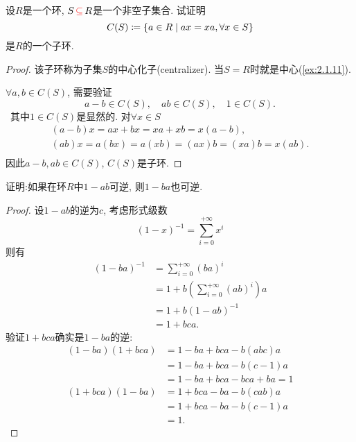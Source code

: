 \begin{problem}\label{ex:1.2.4}
    设$R$是一个环, $S \,\textcolor{red}{\subseteq}\, R$是一个非空子集合. 试证明
    \[
        C(S) \mathrel{\coloneqq} \{a \in R \mid ax = xa, \forall x \in S \}
    \]
    是$R$的一个子环.
\end{problem}

\begin{proof}
    该子环称为子集$S$的中心化子(centralizer). 当$S = R$时就是中心(\ref{ex:2.1.11}).

    $\forall a, b \in C(S)$, 需要验证
    \[
        a - b \in C(S), \quad ab \in C(S), \quad 1 \in C(S).
    \]\
    其中$1 \in C(S)$是显然的. 对$\forall x \in S$
    \[
    \begin{gathered}
        (a - b)x = ax + bx = xa + xb = x(a - b),\\
        (ab)x = a(bx) = a(xb) = (ax)b = (xa)b = x(ab).\\
    \end{gathered}
    \]
    因此$a - b, ab \in C(S)$, $C(S)$是子环.
\end{proof}

\begin{problem}\label{ex:1.2.5}
    证明:如果在环$R$中$1 - ab$可逆, 则$1 - ba$也可逆.
\end{problem}

\begin{proof}
    设$1 - ab$的逆为$c$, 考虑形式级数
    \[
        (1 - x)^{-1} = \sum_{i = 0}^{+\infty} x^i
    \]
    则有
    \[
    \begin{aligned}
        (1 - ba)^{-1} &= \sum_{i = 0}^{+\infty} (ba)^i\\
        &= 1 + b\left(\sum_{i = 0}^{+\infty} (ab)^i\right)a\\
        &= 1 + b(1 - ab)^{-1}\\
        &= 1 + bca.
    \end{aligned} 
    \]
    验证$1 + bca$确实是$1 - ba$的逆: 
    \[
    \begin{aligned}
        (1 - ba)(1 + bca) &= 1 - ba + bca - b(abc)a\\
        &= 1 - ba + bca -b(c - 1)a\\
        &= 1 - ba + bca -bca + ba = 1\\
        (1 + bca)(1 - ba) &= 1 + bca - ba - b(cab)a\\
        &= 1 + bca - ba - b(c - 1)a\\
        &= 1.
    \end{aligned}
    \]
\end{proof}

